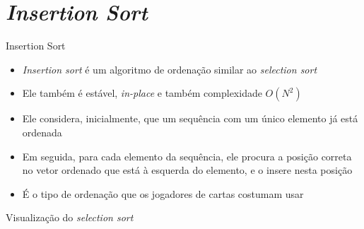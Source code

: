 \section{\itshape Insertion Sort}

\begin{frame}[fragile]{Insertion Sort}

    \begin{itemize}
        \item \textit{Insertion sort} é um algoritmo de ordenação similar ao \textit{selection
            sort}

        \item Ele também é estável, \textit{in-place} e também complexidade $O(N^2)$

        \item Ele considera, inicialmente, que um sequência com um único elemento já 
            está ordenada

        \item Em seguida, para cada elemento da sequência, ele procura a posição correta
            no vetor ordenado que está à esquerda do elemento, e o insere nesta posição

        \item É o tipo de ordenação que os jogadores de cartas costumam usar
        
    \end{itemize}

\end{frame}

\begin{frame}[fragile]{Visualização do \textit{selection sort}}


\end{frame}

